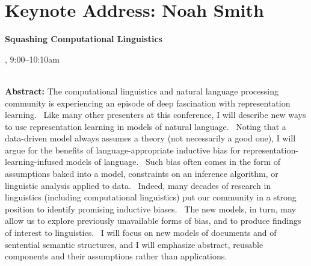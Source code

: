\section{Keynote Address: Noah Smith}

\begin{center}
\begin{Large}
{\bfseries\Large Squashing Computational Linguistics}\vspace{1em}\par
\end{Large}

\daydateyear, 9:00--10:10am \vspace{1em}\\
\PlenaryLoc \\
\vspace{1em}\par
\end{center}

\noindent
{\bfseries Abstract:} The computational linguistics and natural language processing community is experiencing an episode of deep fascination with representation learning.  Like many other presenters at this conference, I will describe new ways to use representation learning in models of natural language.  Noting that a data-driven model always assumes a theory (not necessarily a good one), I will argue for the benefits of language-appropriate inductive bias for representation-learning-infused models of language.  Such bias often comes in the form of assumptions baked into a model, constraints on an inference algorithm, or linguistic analysis applied to data.  Indeed, many decades of research in linguistics (including computational linguistics) put our community in a strong position to identify promising inductive biases.  The new models, in turn, may allow us to explore previously unavailable forms of bias, and to produce findings of interest to linguistics.  I will focus on new models of documents and of sentential semantic structures, and I will emphasize abstract, reusable components and their assumptions rather than applications.

\vspace{3em}\par 

\vfill
\noindent

